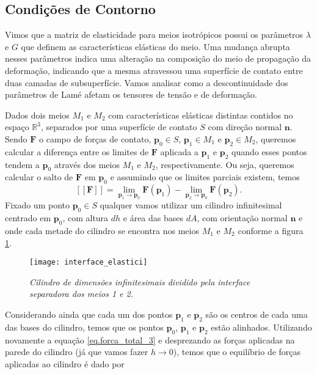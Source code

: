 \subsection{Condi\c{c}\~oes de Contorno}

Vimos que a matriz de elasticidade para meios isotr\'opicos possui os par\^ametros $\lambda$ e $G$ que definem as caracter\'isticas el\'asticas do meio. Uma mudan\c{c}a abrupta nesses par\^ametros indica uma altera\c{c}\~ao na composi\c{c}\~ao do meio de propaga\c{c}\~ao da deforma\c{c}\~ao, indicando que a mesma atravessou uma superf\'icie de contato entre duas camadas de subsuperf\'icie. Vamos analisar como a descontinuidade dos par\^ametros de Lam\'e afetam os tensores de tens\~ao e de deforma\c{c}\~ao.
 
Dados dois meios $M_1$ e $M_2$ com caracter\'isticas el\'asticas distintas contidos no espa\c{c}o $\mathbb{R}^3$, separados por uma superf\'icie de contato $S$ com dire\c{c}\~ao normal $\mathbf{n}$. Sendo $\mathbf{F}$ o campo de for\c{c}as de contato, $\mathbf{p}_0\in S$, $\mathbf{p}_1\in M_1$ e $\mathbf{p}_2\in M_2$, queremos calcular a diferen\c{c}a entre os limites de $\mathbf{F}$ aplicada a $\mathbf{p}_1$ e $\mathbf{p}_2$ quando esses pontos tendem a $\mathbf{p}_0$ atrav\'es dos meios $M_1$ e $M_2$, respectivamente. Ou seja, queremos calcular o salto de $\mathbf{F}$ em $\mathbf{p}_0$ e assumindo que os limites parciais existem, temos
\begin{equation*}
\left[\left[\mathbf{F}\right]\right]=\lim_{\mathbf{p}_1\to\mathbf{p}_0}\mathbf{F}(\mathbf{p}_1)-\lim_{\mathbf{p}_2\to\mathbf{p}_0}\mathbf{F}(\mathbf{p}_2).
\end{equation*}
Fixado um ponto $\mathbf{p}_0\in S$ qualquer vamos utilizar um cilindro infinitesimal centrado em $\mathbf{p}_0$, com altura $dh$ e \'area das bases $dA$, com orienta\c{c}\~ao normal $\mathbf{n}$ e onde cada metade do cilindro se encontra nos meios $M_1$ e $M_2$ conforme a figura \ref{fig.interface_elastici}. 
\begin{figure}[!htb]
\centering
\texttt{[image: interface\_elastici]}
\caption{\textit{Cilindro de dimens\~oes infinitesimais dividido pela interface separadora dos meios 1 e 2.}}
\label{fig.interface_elastici}
\end{figure}
Considerando ainda que cada um dos pontos $\mathbf{p}_1$ e $\mathbf{p}_2$ s\~ao os centros de cada uma das bases do cilindro, temos que os pontos $\mathbf{p}_0$, $\mathbf{p}_1$ e $\mathbf{p}_2$ est\~ao alinhados. Utilizando novamente a equa\c{c}\~ao \ref{eq.forca_total_3} e desprezando as for\c{c}as aplicadas na parede do cilindro (j\'a que vamos fazer $h\to 0$), temos que o equil\'ibrio de for\c{c}as aplicadas ao cilindro \'e dado por 
